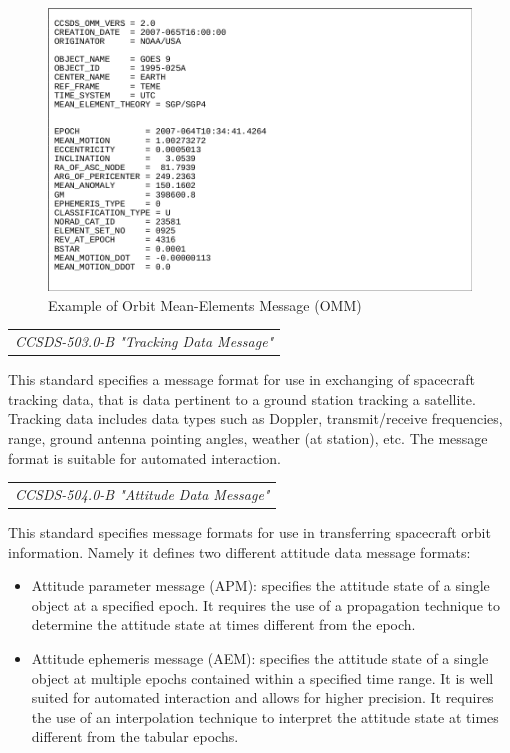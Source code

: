 \begin{figure}[h]
\centering\includegraphics[scale=0.35]{fig/example_of_omm}
\caption{Example of Orbit Mean-Elements Message (OMM)}
\label{fig:Example of Orbit Mean-Elements Message}
\end{figure}

\begin{tabular}{l}
\textit{CCSDS-503.0-B "Tracking Data Message" \cite{CCSDS-503.0-B}} \\
\end{tabular}

This standard specifies a message format for use in exchanging of spacecraft tracking data, that is data pertinent to a ground station tracking a satellite. Tracking data includes data types such as Doppler, transmit/receive frequencies, range, ground antenna pointing angles, weather (at station), etc. The message format is suitable for automated interaction.

\begin{tabular}{l}
\textit{CCSDS-504.0-B "Attitude Data Message" \cite{CCSDS-504.0-B}} \\
\end{tabular}

This standard specifies message formats for use in transferring spacecraft orbit information. Namely it defines two different attitude data message formats:

\begin{itemize}
\item Attitude parameter message (APM): specifies the attitude state of a single object at a specified epoch. It requires the use of a propagation technique to determine the attitude state at times different from the epoch.
\item Attitude ephemeris message (AEM): specifies the attitude state of a single object at multiple epochs contained within a specified time range. It is well suited for automated interaction and allows for higher precision. It requires the use of an interpolation technique to interpret the attitude state at times different from the tabular epochs. 
\end{itemize}

